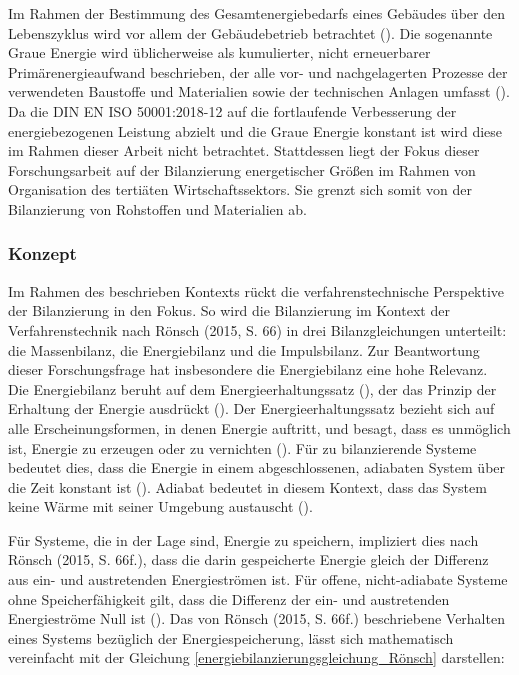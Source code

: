 Im Rahmen der Bestimmung des Gesamtenergiebedarfs eines Gebäudes über den Lebenszyklus wird vor allem der Gebäudebetrieb betrachtet (\cite[S. 133]{Musall.2015}).
Die sogenannte Graue Energie wird üblicherweise als kumulierter, nicht erneuerbarer Primärenergieaufwand beschrieben, der alle vor- und nachgelagerten 
Prozesse der verwendeten Baustoffe und Materialien sowie der technischen Anlagen umfasst (\cite[S. 133]{Musall.2015}). Da die DIN EN ISO 50001:2018-12 
auf die fortlaufende Verbesserung der energiebezogenen Leistung abzielt und die Graue Energie konstant ist wird diese im Rahmen dieser Arbeit nicht 
betrachtet. 
Stattdessen liegt der Fokus dieser Forschungsarbeit auf der Bilanzierung energetischer Größen im Rahmen von Organisation des tertiäten Wirtschaftssektors. 
Sie grenzt sich somit von der Bilanzierung von Rohstoffen und Materialien ab.


\subsubsection{Konzept}
Im Rahmen des beschrieben Kontexts rückt die verfahrenstechnische Perspektive der Bilanzierung in den Fokus. 
So wird die Bilanzierung im Kontext der Verfahrenstechnik nach Rönsch (2015, S. 66) in drei Bilanzgleichungen unterteilt: 
die Massenbilanz, die Energiebilanz und die Impulsbilanz. 
Zur Beantwortung dieser Forschungsfrage hat insbesondere die Energiebilanz eine hohe Relevanz.
Die Energiebilanz beruht auf dem Energieerhaltungssatz (\cite[S. 66]{Rönsch.2015}), der das Prinzip der Erhaltung 
der Energie ausdrückt (\cite[S. 57]{Baehr.1966}). Der Energieerhaltungssatz bezieht sich auf alle Erscheinungsformen, in denen Energie auftritt, 
und besagt, dass es unmöglich ist, Energie zu erzeugen oder zu vernichten (\cite[S. 57]{Baehr.1966}). 
Für zu bilanzierende Systeme bedeutet dies, dass die Energie in einem abgeschlossenen, adiabaten System über die Zeit 
konstant ist (\cite[S. 66]{Rönsch.2015}). 
Adiabat bedeutet in diesem Kontext, dass das System keine Wärme mit seiner Umgebung austauscht (\cite[S. 66]{Rönsch.2015}). 

Für Systeme, die in der Lage sind, Energie zu speichern, impliziert dies nach Rönsch (2015, S. 66f.), 
dass die darin gespeicherte Energie gleich der Differenz aus ein- und austretenden Energieströmen ist. 
Für offene, nicht-adiabate Systeme ohne Speicherfähigkeit gilt, dass die Differenz der ein- und austretenden Energieströme Null ist 
(\cite[S. 66f.]{Rönsch.2015}).
Das von Rönsch (2015, S. 66f.) beschriebene Verhalten eines Systems bezüglich der Energiespeicherung, lässt sich mathematisch 
vereinfacht mit der Gleichung \eqref{energiebilanzierungsgleichung_Rönsch} darstellen:

